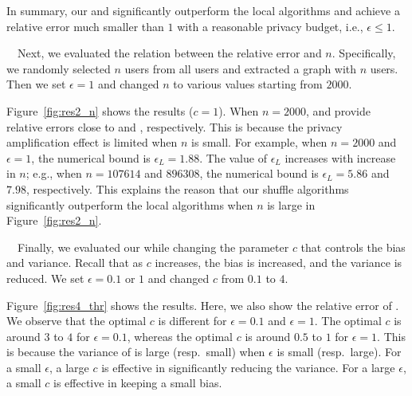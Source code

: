 In summary, our \AlgWSTriVR{} and \AlgWSCyc{} significantly outperform the local algorithms and achieve a relative error much smaller than $1$ with a reasonable privacy budget, i.e., $\epsilon \leq 1$. 

\smallskip
{}~~Next, we evaluated the relation between the relative error and $n$. 
Specifically, we randomly selected $n$ users from all users and extracted a graph with $n$ users. 
Then we set $\epsilon = 1$ and changed $n$ to various values starting from $2000$. 

Figure~\ref{fig:res2_n} shows the results ($c=1$). 
When $n=2000$, \AlgWSTri{} and \AlgWSCyc{} provide 
relative errors close to \AlgWLTri{} and \AlgWLCyc{}, respectively. 
This is because the privacy amplification effect is limited when $n$ is small. 
For example, when $n=2000$ and $\epsilon=1$, 
the numerical bound is $\epsilon_L=1.88$. 
The value of $\epsilon_L$ increases with increase in $n$; e.g., when $n=107614$ and $896308$, the numerical bound is $\epsilon_L= 5.86$ and $7.98$, respectively. 
This explains the reason that our shuffle algorithms significantly outperform the local algorithms when $n$ is large in Figure~\ref{fig:res2_n}. 




\smallskip
{}~~Finally, we evaluated our \AlgWSTriVR{} while changing the parameter $c$ that controls the bias and variance. 
Recall that as $c$ increases, the bias is increased, and the variance is reduced. 
We set $\epsilon=0.1$ or $1$ and changed $c$ from $0.1$ to $4$. 

Figure~\ref{fig:res4_thr} shows the results. 
Here, we also show the relative error of \AlgWSTri{}. 
We observe that the optimal $c$ is different for $\epsilon=0.1$ and $\epsilon=1$. The optimal $c$ is around $3$ to $4$ for $\epsilon=0.1$, whereas the optimal $c$ is around $0.5$ to $1$ for $\epsilon=1$. 
This is because the variance of \AlgWSTri{} is large (resp.~small) when $\epsilon$ is small (resp.~large). 
For a small $\epsilon$, a large $c$ is effective in significantly reducing the variance. 
For a large $\epsilon$, a small $c$ is effective in keeping a small bias. 

